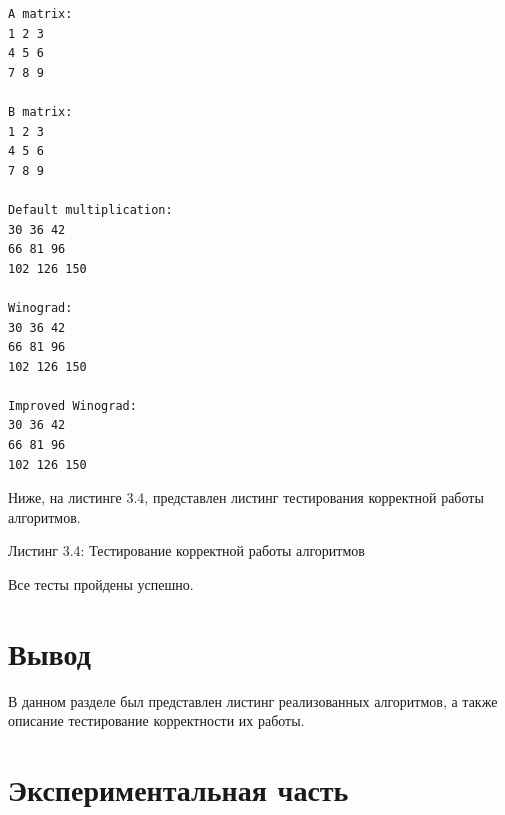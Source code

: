 \documentclass[12pt,a4paper]{article}
\numberwithin{equation}{section}
\begin{document}
\begin{lstlisting}[label=some-code,caption= Число строк равно числу стобцов]
A matrix:
1 2 3
4 5 6
7 8 9

B matrix:
1 2 3
4 5 6
7 8 9  

Default multiplication:  
30 36 42
66 81 96
102 126 150

Winograd:
30 36 42
66 81 96
102 126 150

Improved Winograd:
30 36 42
66 81 96
102 126 150
\end{lstlisting}

\qquad Ниже, на листинге 3.4, представлен листинг тестирования корректной работы алгоритмов.
\begin{center}
	Листинг 3.4: Тестирование корректной работы алгоритмов
		
\end{center}
Все тесты пройдены успешно.\\
\section*{Вывод}
\qquad В данном разделе был представлен листинг реализованных алгоритмов, а также описание тестирование корректности их работы.
\clearpage

\section{Экспериментальная часть}
\end{document}
